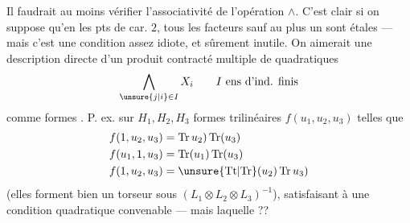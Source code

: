 Il faudrait au moins vérifier\margin{\unsure{!!|!}} l'associativité de l'opération $\wedge$.  C'est clair si on suppose qu'en les pts de car. $2$, tous les facteurs sauf au plus un sont étales --- mais c'est une condition assez idiote, et sûrement inutile. On  aimerait une description directe d'un produit contracté multiple de  quadratiques
\[
 \bigwedge_{\unsure{j|i}\in I} X_i\qquad I\ \text{ens d'ind. finis}
\]
 comme formes . P. ex. sur $H_1,H_2,H_3$ formes trilinéaires  $f(u_1,u_2,u_3)$ telles que
\[
 \begin{aligned}
 f(1,u_2,u_3)&=\operatorname{Tr}u_2)\operatorname{Tr}(u_3)\\
 f(u_1,1,u_3)&=\operatorname{Tr}(u_1)\operatorname{Tr}(u_3)\\
 f(1,u_2,u_3)&=\unsure{\mathrm{Tt}|\mathrm{Tr}}(u_2)\operatorname{Tr}u_3)
 \end{aligned}
\]
(elles forment bien un torseur sous $(L_1\otimes L_2\otimes L_3)^{-1}$), satisfaisant à une condition quadratique convenable --- mais laquelle ??

